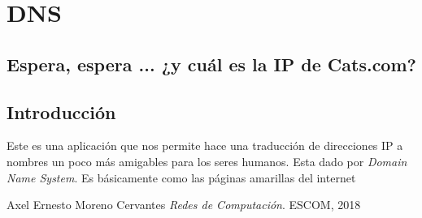 \documentclass[12pt, fleqn]{report}                             %
\theoremstyle{break}                                            %
\begin{document}
    \chapter{DNS}
    \section*{Espera, espera ... ¿y cuál es la IP de Cats.com?}


        \clearpage
        \section{Introducción}

            Este es una aplicación que nos permite hace una traducción de direcciones IP a
            nombres un poco más amigables para los seres humanos.
            Esta dado por \emph{Domain Name System}. Es básicamente como las páginas
            amarillas del internet



\begin{thebibliography}{10}

        Axel Ernesto Moreno Cervantes
        \textit{Redes de Computación}. 
        ESCOM, 2018

\end{thebibliography}
\end{document}
